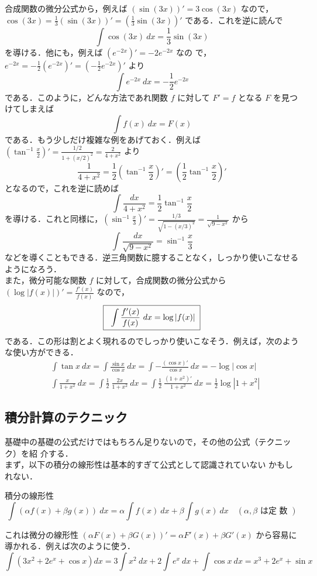 \documentclass[10pt, uplatex, dvipdfmx]{jsarticle}
\theoremstyle{definition}
\numberwithin{equation}{section}
\newcommand{\ds}{\displaystyle}
\begin{document}
合成関数の微分公式から，例えば $\left( \sin\left(3x\right)\right)' = 3
\cos(3x)$
なので，$\ds \cos(3x) = \frac{1}{3}\left( \sin (3x)\right)' = \left(
  \frac{1}{3} \sin(3x) \right)'$ である．これを逆に読んで
\[
 \int\cos (3x) \ dx = \frac{1}{3} \sin (3x)
\]
を導ける．他にも，例えば $\left( e^{-2x}\right)' = -2 e^{-2x}$ なの
で，$\ds e^{-2x} = -\frac{1}{2} \left( e^{-2x}\right)' = \left(
-\frac{1}{2} e^{-2x}\right)'$ より
\[
  \int e^{-2x} \ dx = -\frac{1}{2} e^{-2x}
\]
である．このように，どんな方法であれ関数 $f$ に対して $F' = f$ となる $F$ を見つけてしまえば
\[
  \int f(x) \ dx = F(x)
\]
である．もう少しだけ複雑な例をあげておく．例えば
$\ds \left( \tan^{-1} \frac{x}{2}\right)' = \frac{1/2}{1 + \left(x/2\right)^2} = \frac{2}{4+x^2}$ より
\[
  \frac{1}{4+x^2} = \frac{1}{2} \left( \tan^{-1}\frac{x}{2}\right)' = \left( \frac{1}{2}\tan^{-1}\frac{x}{2}\right)'
\]
となるので，これを逆に読めば
\[
  \int \frac{dx}{4+x^2} = \frac{1}{2} \tan^{-1}\frac{x}{2}
\]
を導ける．これと同様に，$\ds \left(\sin^{-1} \frac{x}{3} \right)' =
\frac{1/3}{\sqrt{1-(x/3)^2}}=\frac{1}{\sqrt{9-x^2}}$ から
\[
  \int \frac{dx}{\sqrt{9-x^2}} = \sin^{-1} \frac{x}{3}
\]
などを導くこともできる．逆三角関数に臆することなく，しっかり使いこなせるようになろう．\\

また，微分可能な関数 $f$ に対して，合成関数の微分公式から
$\ds \left(\log | f(x) |\right)' = \frac{f'(x)}{f(x)}$ なので，
\[
  \fbox{\; $\ds \int \frac{f'(x)}{f(x)} \ dx = \log | f(x) |$\;}
\]
である．この形は割とよく現れるのでしっかり使いこなそう．例えば，次のような使い方ができる．
\[
  \begin{aligned}
    &\int \tan x \ dx = \int \frac{\sin x }{\cos x} \ dx = \int  - \frac{\left( \cos x\right)'}{\cos x} \ dx
      = - \log|\cos x| \\ 
    &\int \frac{x}{1+x^2} \ dx = \int \frac{1}{2}~ \frac{2x}{1+x^2} \ dx
      = \int \frac{1}{2}~\frac{(1+x^2)'}{1+x^2} \ dx
      = \frac{1}{2} \log|1+x^2|
  \end{aligned}
\]


\newpage

\subsection{積分計算のテクニック}

基礎中の基礎の公式だけではもちろん足りないので，その他の公式（テクニック）を紹
介する．\\

まず，以下の積分の線形性は基本的すぎて公式として認識されていない
かもしれない．
\begin{itembox}[l]{積分の線形性}
  \[
    \int \left( \alpha f(x) + \beta g(x) \right) \ dx = \alpha \int
    f(x) \ dx + \beta \int g(x) \ dx \quad (\alpha, \beta \text{ は定
      数 } )
  \]
\end{itembox}
これは微分の線形性
$\left( \alpha F(x) + \beta G(x) \right)' = \alpha F'(x) + \beta
G'(x)$ から容易に導かれる．例えば次のように使う．
\[
  \int \left( 3x^2 + 2e^x + \cos x \right) dx
  = 3 \int x^2 \ dx + 2 \int e^x \ dx + \int \cos x \ dx 
  = x^3  + 2 e^x + \sin x 
\]\\
\end{document}
